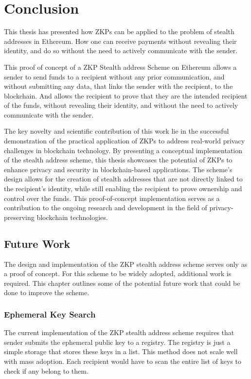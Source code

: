 \chapter{Conclusion}\label{chapter:conclusion}

This thesis has presented how ZKPs can be applied to the problem of stealth
addresses in Ethereum. How one can receive payments without revealing their
identity, and do so without the need to actively communicate with the sender.

This proof of concept of a ZKP Stealth address Scheme on Ethereum allows
a sender to send funds to a recipient without any prior communication, and
without submitting any data, that links the sender with the recipient, to the blockchain.
And allows the recipient to prove that they are the intended recipient of the
funds, without revealing their identity, and without the need to actively
communicate with the sender.

The key novelty and scientific contribution of this work lie in the successful
demonstration of the practical application of ZKPs to address real-world
privacy challenges in blockchain technology. By presenting a conceptual
implementation of the stealth address scheme, this thesis showcases the
potential of ZKPs to enhance privacy and security in blockchain-based
applications. The scheme's design allows for the creation of stealth addresses
that are not directly linked to the recipient's identity, while still enabling
the recipient to prove ownership and control over the funds. This
proof-of-concept implementation serves as a contribution to the
ongoing research and development in the field of privacy-preserving blockchain
technologies.

\section{Future Work}

The design and implementation of the ZKP stealth address scheme serves only as
a proof of concept. For this scheme to be widely adopted, additional work is
required. This chapter outlines some of the potential future work that could be
done to improve the scheme.

\subsection*{Ephemeral Key Search}

The current implementation of the ZKP stealth address scheme requires that sender
submits the ephemeral public key to a registry. The registry is just a simple
storage that stores these keys in a list. This method does not scale well with
mass adoption. Each recipient would have to scan the entire list of keys to
check if any belong to them.

